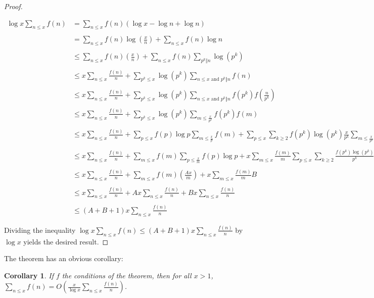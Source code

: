 \documentclass[12pt]{article}
\newtheorem*{cor*}{Corollary}
\begin{document}
\begin{proof}
\begin{center}
$\begin{array}{ll}
\displaystyle \log x \sum_{n \le x} f(n) & \displaystyle =\sum_{n \le x} f(n)(\log x-\log n+\log n) \\
\\
& \displaystyle =\sum_{n \le x} f(n) \log\left(\frac{x}{n}\right)+\sum_{n \le x} f(n)\log n \\
\\
& \displaystyle \le \sum_{n \le x} f(n) \left(\frac{x}{n}\right)+\sum_{n \le x} f(n) \sum_{p^k \Vert n} \log (p^k) \\
\\
& \displaystyle \le x\sum_{n \le x} \frac{f(n)}{n}+\sum_{p^k \le x} \log(p^k) \sum_{n \le x \text{ and }p^k \Vert n} f(n) \\
\\
& \displaystyle \le x\sum_{n \le x} \frac{f(n)}{n}+\sum_{p^k \le x} \log(p^k) \sum_{n \le x \text{ and }p^k \Vert n} f(p^k)f\left(\frac{n}{p^k}\right) \\
\\
& \displaystyle \le x\sum_{n \le x} \frac{f(n)}{n}+\sum_{p^k \le x} \log(p^k) \sum_{m \le \frac{x}{p^k}} f(p^k)f(m) \\
\\
& \displaystyle \le x\sum_{n \le x} \frac{f(n)}{n}+\sum_{p \le x} f(p)\log p \sum_{m \le \frac{x}{p}} f(m)+\sum_{p \le x} \sum_{k \ge 2} f(p^k) \log(p^k) \frac{x}{p^k} \sum_{m \le \frac{x}{p^k}} \frac{f(m)}{m} \\
\\
& \displaystyle \le x\sum_{n \le x} \frac{f(n)}{n}+\sum_{m \le x} f(m) \sum_{p \le \frac{x}{m}} f(p)\log p+x\sum_{m \le x} \frac{f(m)}{m} \sum_{p \le x} \sum_{k \ge 2} \frac{f(p^k)\log(p^k)}{p^k} \\
\\
& \displaystyle \le x\sum_{n \le x} \frac{f(n)}{n}+\sum_{m \le x} f(m) \left( \frac{Ax}{m} \right)+x\sum_{m \le x} \frac{f(m)}{m} B \\
\\
& \displaystyle \le x\sum_{n \le x} \frac{f(n)}{n}+Ax\sum_{n \le x} \frac{f(n)}{n}+Bx \sum_{n \le x} \frac{f(n)}{n} \\
\\
& \displaystyle \le (A+B+1)x\sum_{n \le x} \frac{f(n)}{n} \end{array}$
\end{center}

Dividing the inequality $\displaystyle \log x \sum_{n \le x} f(n) \le (A+B+1)x\sum_{n \le x} \frac{f(n)}{n}$ by $\log x$ yields the desired result.
\end{proof}

The theorem has an obvious corollary:

\begin{cor*}
If $f$  the conditions of the theorem, then for all $x>1$, $\displaystyle \sum_{n \le x} f(n)=O\left(\frac{x}{\log x} \sum_{n \le x} \frac{f(n)}{n}\right)$.
\end{cor*}
\end{document}
